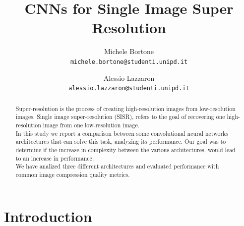 \documentclass[10pt,twocolumn,letterpaper]{article}
\begin{document}
\title{CNNs for Single Image Super Resolution}

\author{Michele Bortone\\
{\tt\small michele.bortone@studenti.unipd.it}
\and
Alessio Lazzaron\\
{\tt\small alessio.lazzaron@studenti.unipd.it}
}

\maketitle

\begin{abstract}
   	Super-resolution is the process of creating high-resolution images from low-resolution images.
   	Single image super-resolution (SISR), refers to the goal of recovering one high-resolution image from one low-resolution image.\\
    In this study we report a comparison between some convolutional neural networks architectures that can solve this task, analyzing its performance. Our goal was to determine if the increase in complexity between the various architectures,  would lead to an increase in performance.\\
    We have analized three different architectures and evaluated performance with common image compression quality metrics.
    
\end{abstract}

\section{Introduction}
\end{document}
